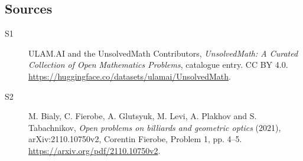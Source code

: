 \documentclass[11pt]{article}
\begin{document}
\subsection{Sources}
\begin{description}
\item[\hypertarget{source:statement:1}{S1}] ULAM.AI and the UnsolvedMath Contributors, \emph{UnsolvedMath: A Curated Collection of Open Mathematics Problems}, catalogue entry. CC BY 4.0. \url{https://huggingface.co/datasets/ulamai/UnsolvedMath}.
\item[\hypertarget{source:statement:2}{S2}] M. Bialy, C. Fierobe, A. Glutsyuk, M. Levi, A. Plakhov and S. Tabachnikov, \emph{Open problems on billiards and geometric optics} (2021), arXiv:2110.10750v2, Corentin Fierobe, Problem 1, pp. 4--5. \url{https://arxiv.org/pdf/2110.10750v2}.
\end{description}
\label{end:statement}
\end{document}
